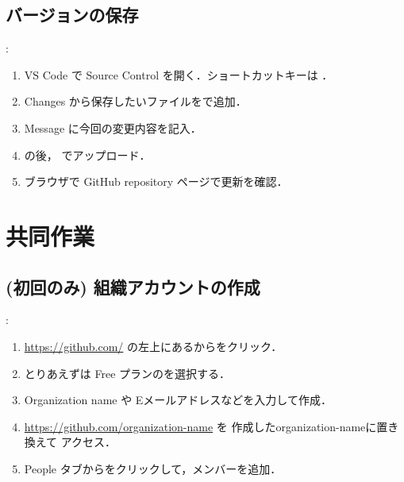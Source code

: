 \documentclass[aspectratio=169,dvipdfmx,cjk]{beamer}
\newcommand{\blue}[1]{ {\color{blue} #1} }
\begin{document}
\subsection{バージョンの保存}
\begin{frame}{\insertsection \thesubsection: \insertsubsection}
  \begin{enumerate}
    \item VS Code で Source Control を開く．ショートカットキーは ．
    \item Changes から保存したいファイルを\beamerbutton{+}で追加．
    \item Message に今回の変更内容を記入．
    \item {} の後， でアップロード．
    \item ブラウザで GitHub repository ページで更新を確認．
  \end{enumerate}
\end{frame}

\section{共同作業}
\subsection{(初回のみ) 組織アカウントの作成}
\begin{frame}{\insertsection \thesubsection: \insertsubsection}
  \begin{enumerate}
    \item \href{https://github.com/}{https://github.com/} の左上にある\beamerbutton{+}からをクリック．
    \item とりあえずは Free プランのを選択する．
    \item Organization name や Eメールアドレスなどを入力して作成．
    \item \href{https://github.com/organization-name}{https://github.com/organization-name} を\blue{作成したorganization-nameに置き換えて}アクセス．
    \item People タブからをクリックして，メンバーを追加．
  \end{enumerate}
\end{frame}
\end{document}
